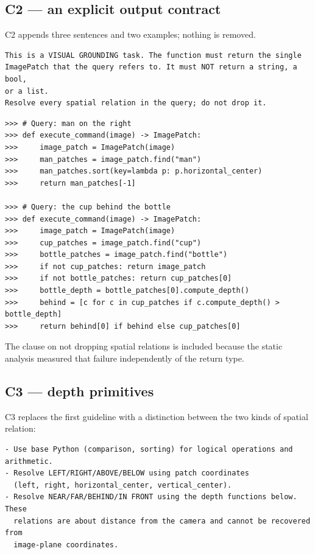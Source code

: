 \documentclass[12pt,a4paper,oneside]{report}
\begin{document}
\subsection{C2 --- an explicit output contract}

C2 appends three sentences and two examples; nothing is removed.

\begin{lstlisting}[style=plainlist]
This is a VISUAL GROUNDING task. The function must return the single
ImagePatch that the query refers to. It must NOT return a string, a bool,
or a list.
Resolve every spatial relation in the query; do not drop it.
\end{lstlisting}

\begin{lstlisting}
>>> # Query: man on the right
>>> def execute_command(image) -> ImagePatch:
>>>     image_patch = ImagePatch(image)
>>>     man_patches = image_patch.find("man")
>>>     man_patches.sort(key=lambda p: p.horizontal_center)
>>>     return man_patches[-1]

>>> # Query: the cup behind the bottle
>>> def execute_command(image) -> ImagePatch:
>>>     image_patch = ImagePatch(image)
>>>     cup_patches = image_patch.find("cup")
>>>     bottle_patches = image_patch.find("bottle")
>>>     if not cup_patches: return image_patch
>>>     if not bottle_patches: return cup_patches[0]
>>>     bottle_depth = bottle_patches[0].compute_depth()
>>>     behind = [c for c in cup_patches if c.compute_depth() > bottle_depth]
>>>     return behind[0] if behind else cup_patches[0]
\end{lstlisting}

The clause on not dropping spatial relations is included because the static analysis
measured that failure independently of the return type.

\subsection{C3 --- depth primitives}

C3 replaces the first guideline with a distinction between the two kinds of spatial
relation:

\begin{lstlisting}[style=plainlist]
- Use base Python (comparison, sorting) for logical operations and arithmetic.
- Resolve LEFT/RIGHT/ABOVE/BELOW using patch coordinates
  (left, right, horizontal_center, vertical_center).
- Resolve NEAR/FAR/BEHIND/IN FRONT using the depth functions below. These
  relations are about distance from the camera and cannot be recovered from
  image-plane coordinates.
\end{lstlisting}
\end{document}
